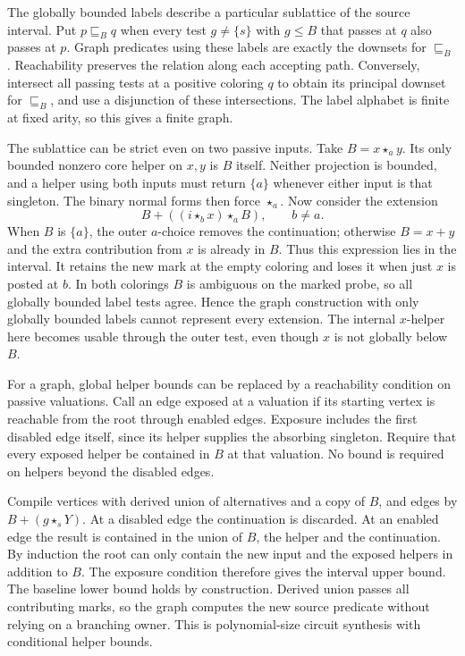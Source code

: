 The globally bounded labels describe a particular
sublattice of the source interval. Put $p\sqsubseteq_B q$
when every test $g\ne\{s\}$ with $g\le B$ that passes
at $q$ also passes at $p$. Graph predicates using
these labels are exactly the downsets for
$\sqsubseteq_B$. Reachability preserves the relation
along each accepting path. Conversely, intersect
all passing tests at a positive coloring $q$ to
obtain its principal downset for $\sqsubseteq_B$,
and use a disjunction of these intersections.
The label alphabet is finite at fixed arity,
so this gives a finite graph.

The sublattice can be strict even on two passive
inputs. Take $B=x\star_a y$. Its only bounded
nonzero core helper on $x,y$ is $B$ itself.
Neither projection is bounded, and a helper using
both inputs must return $\{a\}$ whenever either
input is that singleton. The binary normal forms
then force $\star_a$. Now consider the extension
\[
                    B+((i\star_b x)\star_a B),
                    \qquad b\ne a.
\]
When $B$ is $\{a\}$, the outer $a$-choice removes
the continuation; otherwise $B=x+y$ and the
extra contribution from $x$ is already in $B$.
Thus this expression lies in the interval. It
retains the new mark at the empty coloring and
loses it when just $x$ is posted at $b$. In both
colorings $B$ is ambiguous on the marked probe,
so all globally bounded label tests agree.
Hence the graph construction with only
globally bounded labels cannot represent every
extension. The internal $x$-helper here becomes
usable through the outer test, even though
$x$ is not globally below $B$.

For a graph, global helper bounds can be replaced by
a reachability condition on passive valuations.
Call an edge exposed at a valuation if its starting
vertex is reachable from the root through enabled
edges. Exposure includes the first disabled edge
itself, since its helper supplies the absorbing
singleton. Require that every exposed helper be
contained in $B$ at that valuation. No bound is
required on helpers beyond the disabled edges.

Compile vertices with derived union of alternatives
and a copy of $B$, and edges by $B+(g\star_s Y)$.
At a disabled edge the continuation is discarded.
At an enabled edge the result is contained in the
union of $B$, the helper and the continuation.
By induction the root can only contain the new
input and the exposed helpers in addition to $B$.
The exposure condition therefore gives the interval
upper bound. The baseline lower bound holds by
construction. Derived union passes all contributing
marks, so the graph computes the new source
predicate without relying on a branching owner.
This is polynomial-size circuit synthesis with
conditional helper bounds.

